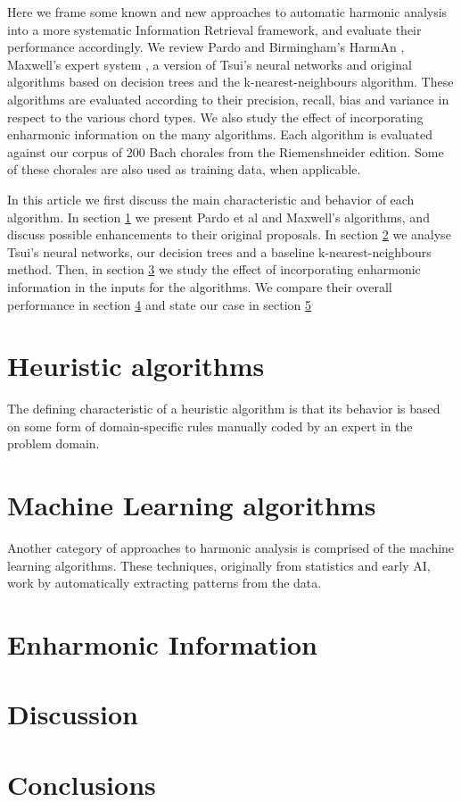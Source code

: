 \documentclass{article}
\begin{document}
Here we frame some known and new approaches to automatic harmonic
analysis into a more systematic Information Retrieval framework, and
evaluate their performance accordingly.  We review Pardo and
Birmingham's HarmAn \cite{pardo.ea:automated}, Maxwell's expert system
\cite{maxwell:expert}, a version of Tsui's neural networks
\cite{tsui:harmonic} and original algorithms based on decision trees
and the k-nearest-neighbours algorithm.
These algorithms are evaluated according to their precision, recall,
bias and variance in respect to the various chord types.  We also
study the effect of incorporating enharmonic information on the many
algorithms. Each algorithm is evaluated against our corpus of 200 Bach
chorales from the Riemenshneider \cite{bach:371} edition.  Some of
these chorales are also used as training data, when applicable.

In this article we first discuss the main characteristic and behavior
of each algorithm. In section \ref{sec:heuristic-algorithms} we
present Pardo et al and Maxwell's algorithms, and discuss possible
enhancements to their original proposals. In section
\ref{sec:stat-algor} we analyse Tsui's neural networks, our decision
trees and a baseline k-nearest-neighbours method. Then, in section
\ref{sec:enharmonic} we study the effect of incorporating enharmonic
information in the inputs for the algorithms. We compare their overall
performance in section \ref{sec:discussion} and state our case in
section \ref{sec:conclusions}


\section{Heuristic algorithms}
\label{sec:heuristic-algorithms}

The defining characteristic of a heuristic algorithm is that its
behavior is based on some form of domain-specific rules manually coded
by an expert in the problem domain.

\section{Machine Learning algorithms}
\label{sec:stat-algor}

Another category of approaches to harmonic analysis is comprised of
the machine learning algorithms. These techniques, originally from
statistics and early AI, work by automatically extracting patterns
from the data. 

\section{Enharmonic Information}
\label{sec:enharmonic}



\section{Discussion}
\label{sec:discussion}



\section{Conclusions}
\label{sec:conclusions}




\end{document}
